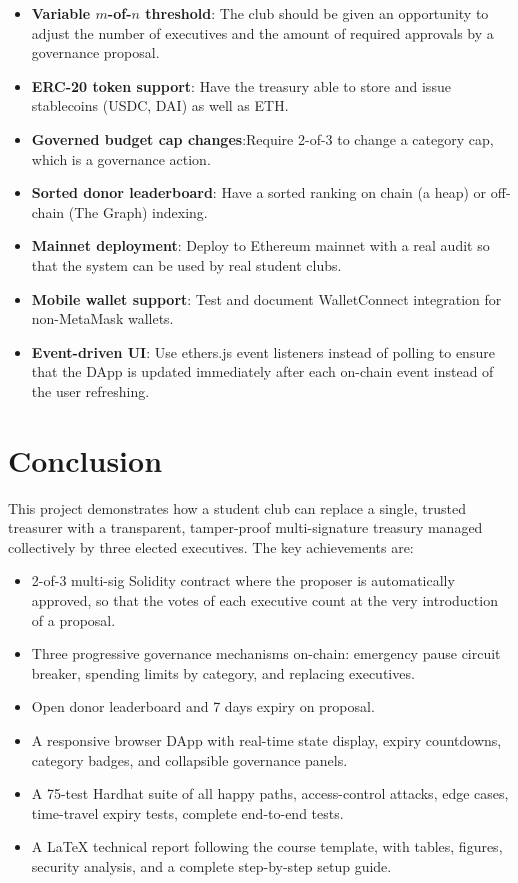 \documentclass[12pt,a4paper]{article}
\begin{document}
\begin{itemize}
  \item \textbf{Variable $m$-of-$n$ threshold}: The club should be given an opportunity to adjust the number of executives and the amount of required approvals by a governance proposal.
  \item \textbf{ERC-20 token support}: Have the treasury able to store and issue stablecoins (USDC, DAI) as well as ETH.
  \item \textbf{Governed budget cap changes}:Require 2-of-3 to change a category cap, which is a governance action.
  \item \textbf{Sorted donor leaderboard}: Have a sorted ranking on chain (a heap) or off-chain (The Graph) indexing.
  \item \textbf{Mainnet deployment}: Deploy to Ethereum mainnet with a real audit so that the system can be used by real student clubs.
  \item \textbf{Mobile wallet support}: Test and document WalletConnect integration for non-MetaMask wallets.
  \item \textbf{Event-driven UI}: Use ethers.js event listeners instead of polling to ensure that the DApp is updated immediately after each on-chain event instead of the user refreshing.
\end{itemize}

\section{Conclusion}

This project demonstrates how a student club can replace a single, trusted treasurer with a transparent, tamper-proof multi-signature treasury managed collectively by three elected executives. The key achievements are:

\begin{itemize}
  \item 2-of-3 multi-sig Solidity contract where the proposer is automatically approved, so that the votes of each executive count at the very introduction of a proposal.
  \item Three progressive governance mechanisms on-chain: emergency pause circuit breaker, spending limits by category, and replacing executives.
  \item Open donor leaderboard and 7 days expiry on proposal.
  \item A responsive browser DApp with real-time state display, expiry countdowns, category badges, and collapsible governance panels.
  \item A 75-test Hardhat suite of all happy paths, access-control attacks, edge cases, time-travel expiry tests, complete end-to-end tests.
  \item A LaTeX technical report following the course template, with tables, figures, security analysis, and a complete step-by-step setup guide.
\end{itemize}
\end{document}
